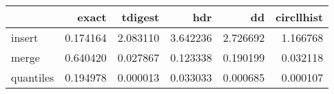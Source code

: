 \begin{tabular}{lrrrrr}
\toprule
{} &     exact &   tdigest &       hdr &        dd &  circllhist \\
\midrule
insert    &  0.174164 &  2.083110 &  3.642236 &  2.726692 &    1.166768 \\
merge     &  0.640420 &  0.027867 &  0.123338 &  0.190199 &    0.032118 \\
quantiles &  0.194978 &  0.000013 &  0.033033 &  0.000685 &    0.000107 \\
\bottomrule
\end{tabular}
